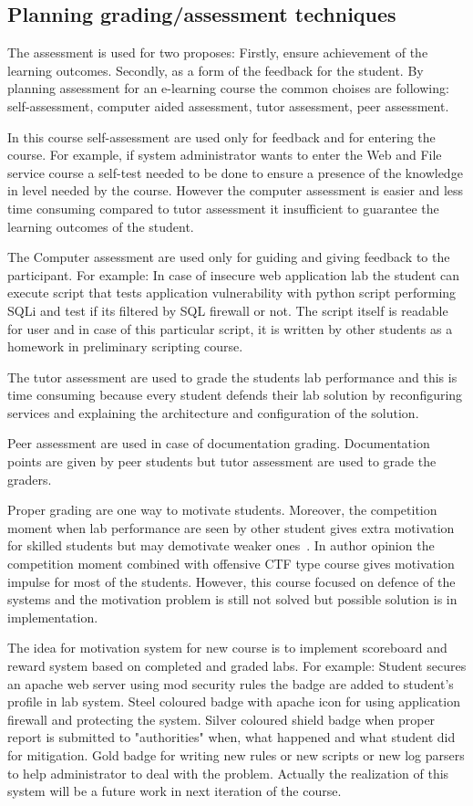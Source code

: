 \subsection{Planning grading/assessment techniques}
The assessment is used for two proposes: Firstly, ensure achievement of the learning outcomes. Secondly, as a form of the feedback for the student. By planning assessment for an e-learning course the common choises are following: self-assessment, computer aided assessment, tutor assessment, peer assessment. ~\citep{OppeArenduskeskus2010}

In this course self-assessment are used only for feedback and for entering the course. For example, if system administrator wants to enter the Web and File service course a self-test needed to be done to ensure a presence of the knowledge in level needed by the course. However the computer assessment is easier and less time consuming compared to tutor assessment it insufficient to guarantee the learning outcomes of the student. 

The Computer assessment are used only for guiding and giving feedback to the participant. For example: In case of insecure web application lab the student can execute script that tests application vulnerability with python script performing \gls{SQLi} and test if its filtered by \gls{SQL} firewall or not. The script itself is readable for user and in case of this particular script, it is written by other students as a homework in preliminary scripting course.


The tutor assessment are used to grade the students lab performance and this is time consuming because every student defends their lab solution by reconfiguring services and explaining the architecture and configuration of the solution.

Peer assessment are used in case of documentation grading. Documentation points are given by peer students but tutor assessment are used to grade the graders.

Proper grading are one way to motivate students. Moreover, the competition moment when lab performance are seen by other student gives extra motivation for skilled students but may demotivate weaker ones~\citep{KasakKaur}. In author opinion the competition moment combined with offensive \gls{CTF} type course gives motivation impulse for most of the students. However, this course focused on defence of the systems and the motivation problem is still not solved but possible solution is in implementation.

The idea for motivation system for new course is to implement scoreboard and reward system based on completed and graded labs. For example: Student secures an apache web server using mod security rules the badge are added to student's profile in lab system. Steel coloured badge with apache icon for using application firewall and protecting the system. Silver coloured shield badge when proper report is submitted to "authorities" when, what happened and what student did for mitigation. Gold badge for writing new rules or new scripts or new log parsers to help administrator to deal with the problem. Actually the realization of this system will be a future work in next iteration of the course.

